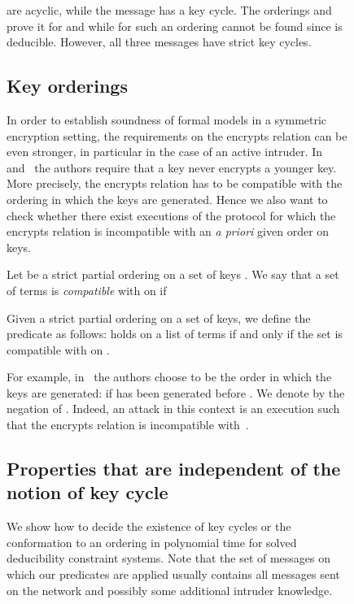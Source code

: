 \documentclass[acmtocl,acmnow]{acmtrans2m}
\newcommand{\dedsyss}[1]{deducibility constraint systems}
\begin{document}
\begin{figure}[t]
{{\begin{example}
are acyclic, while the message
 has
a key cycle. The orderings  and  prove it
for  and  while for  such an ordering cannot be found since
 is deducible. However, all three messages have strict key
cycles.
\end{example}


\subsection{Key orderings}
In order to establish soundness of formal models in a symmetric
encryption setting, the requirements on the encrypts relation
can be even stronger, in particular in the case of an active
intruder. In~\cite{Backes_Pfitzmann_CSFW04_symmetric_encryption}
and~\cite{cryptoeprint:2005:020} the authors require that a key never
encrypts a younger key. More precisely, the encrypts relation has to
be compatible with the ordering in which the keys are generated. Hence we also want to check whether there
exist executions of the protocol for which the encrypts relation is incompatible with an \textit{a priori}
given order on keys.

\begin{definition}\label{def:korder}
Let  be a strict partial ordering on a set of  keys . We say that a set of terms 
is \emph{compatible} with  on  if


Given a strict partial ordering  on a set of keys, we define the predicate  as follows:
 holds on a list of terms  if and only if
the set  is compatible with  on .
\end{definition}
For example,
in~\cite{Backes_Pfitzmann_CSFW04_symmetric_encryption,cryptoeprint:2005:020}
the authors choose  to be the order in which the keys are
generated:  if  has been generated before .
We denote by   the
negation of . Indeed, an attack in this context is an execution such that the
encrypts relation is incompatible with~. 




\subsection{Properties that are independent of the notion of key cycle}
We show how to decide the existence of key cycles or the conformation
to an ordering in polynomial time for solved \dedsyss{}.
Note that the set of messages on which our predicates are applied usually contains all messages sent on
the network and possibly some additional intruder knowledge.




}}
\end{figure}
\end{document}
